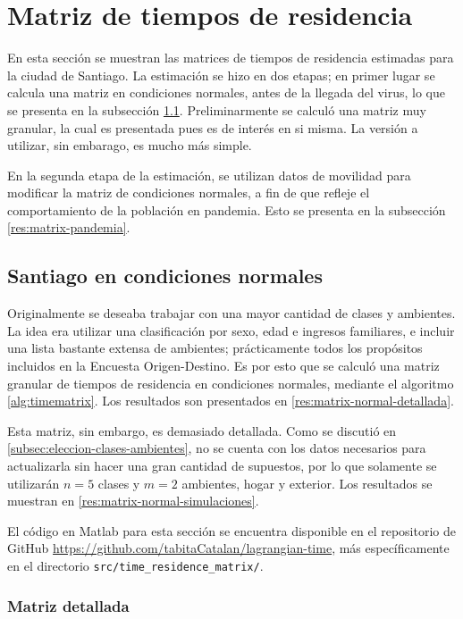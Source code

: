 \section{Matriz de tiempos de residencia} \label{res:matriz}

En esta sección se muestran las matrices de tiempos de residencia estimadas para la ciudad de Santiago. La estimación se hizo en dos etapas; en primer lugar se calcula una matriz en condiciones normales, antes de la llegada del virus, lo que se presenta en la subsección \ref{res:matrix-normal}. Preliminarmente se calculó una matriz muy granular, la cual es presentada pues es de interés en si misma. La versión a utilizar, sin embarago, es mucho más simple.

En la segunda etapa de la estimación, se utilizan datos de movilidad para modificar la matriz de condiciones normales, a fin de que refleje el comportamiento de la población en pandemia. Esto se presenta en la subsección \ref{res:matrix-pandemia}.

\subsection{Santiago en condiciones normales}\label{res:matrix-normal}

Originalmente se deseaba trabajar con una mayor cantidad de clases y ambientes. La idea era utilizar una clasificación por sexo, edad e ingresos familiares, e incluir una lista bastante extensa de ambientes; prácticamente todos los propósitos incluidos en la Encuesta Origen-Destino. Es por esto que se calculó una matriz granular de tiempos de residencia en condiciones normales, mediante el algoritmo \ref{alg:timematrix}. Los resultados son presentados en \ref{res:matrix-normal-detallada}.

Esta matriz, sin embargo, es demasiado detallada. Como se discutió en \ref{subsec:eleccion-clases-ambientes}, no se cuenta con los datos necesarios para actualizarla sin hacer una gran cantidad de supuestos, por lo que solamente se utilizarán \(n = 5\) clases y \(m = 2\) ambientes, hogar y exterior. Los resultados se muestran en \ref{res:matrix-normal-simulaciones}.

El código en Matlab para esta sección se encuentra disponible en el repositorio de GitHub \url{https://github.com/tabitaCatalan/lagrangian-time}, más específicamente en el directorio \texttt{src/time\_residence\_matrix/}.

\subsubsection*{Matriz detallada}\label{res:matrix-normal-detallada}


